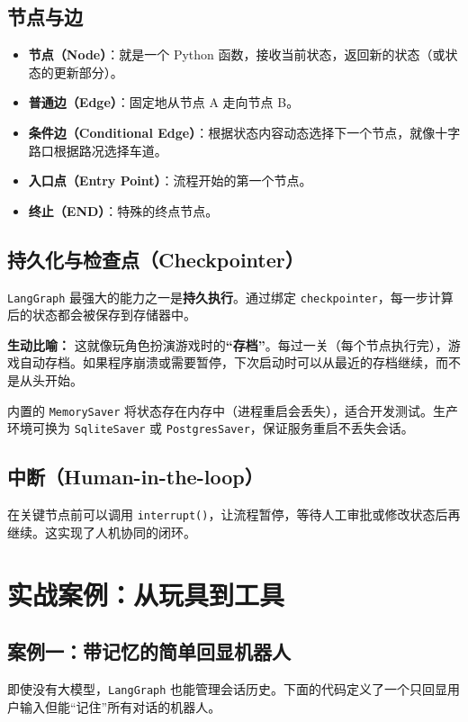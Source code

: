 \documentclass[12pt,a4paper]{ctexart}
\newcommand{\langgraph}{\texttt{LangGraph}}
\begin{document}
\subsection{节点与边}
\begin{itemize}
    \item \textbf{节点（Node）}：就是一个 Python 函数，接收当前状态，返回新的状态（或状态的更新部分）。
    \item \textbf{普通边（Edge）}：固定地从节点 A 走向节点 B。
    \item \textbf{条件边（Conditional Edge）}：根据状态内容动态选择下一个节点，就像十字路口根据路况选择车道。
    \item \textbf{入口点（Entry Point）}：流程开始的第一个节点。
    \item \textbf{终止（END）}：特殊的终点节点。
\end{itemize}

\subsection{持久化与检查点（Checkpointer）}
\langgraph{} 最强大的能力之一是\textbf{持久执行}。通过绑定 \texttt{checkpointer}，每一步计算后的状态都会被保存到存储器中。

\textbf{生动比喻：}  
这就像玩角色扮演游戏时的\textbf{“存档”}。每过一关（每个节点执行完），游戏自动存档。如果程序崩溃或需要暂停，下次启动时可以从最近的存档继续，而不是从头开始。

内置的 \texttt{MemorySaver} 将状态存在内存中（进程重启会丢失），适合开发测试。生产环境可换为 \texttt{SqliteSaver} 或 \texttt{PostgresSaver}，保证服务重启不丢失会话。

\subsection{中断（Human-in-the-loop）}
在关键节点前可以调用 \texttt{interrupt()}，让流程暂停，等待人工审批或修改状态后再继续。这实现了人机协同的闭环。

\section{实战案例：从玩具到工具}
\label{sec:examples}

\subsection{案例一：带记忆的简单回显机器人}
即使没有大模型，\langgraph{} 也能管理会话历史。下面的代码定义了一个只回显用户输入但能“记住”所有对话的机器人。
\end{document}
